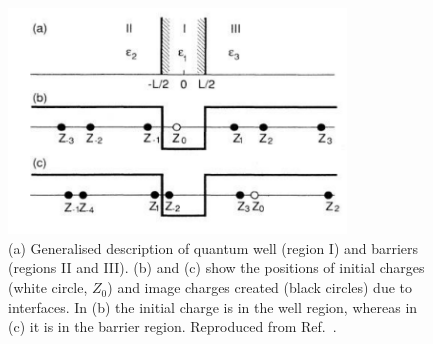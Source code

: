 \begin{figure}[h!]
\centering
\includegraphics[width=0.8\textwidth]{Fig17}
\caption{(a) Generalised description of quantum well (region I) and barriers (regions II and III). (b) and (c) show the positions of initial charges (white circle, $Z_0$) and image charges created (black circles) due to interfaces. In (b) the initial charge is in the well region, whereas in (c) it is in the barrier region. Reproduced from Ref.\ \cite{Kumagai1989}.}
\label{2Fig17}
\end{figure}

